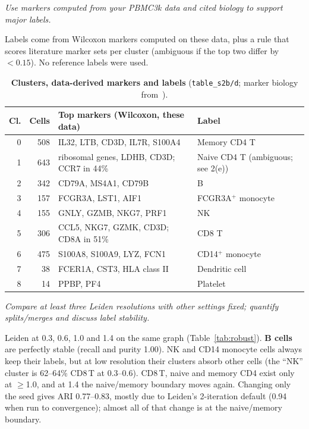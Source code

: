 \documentclass{cisXXX} %
\newcommand{\code}[1]{\texttt{\small #1}}
\newcommand{\q}[1]{\textit{#1}\par\smallskip\noindent}
\begin{document}
\label{s2}
\q{Use markers computed from your PBMC3k data and cited biology to support major labels.}
Labels come from Wilcoxon markers computed on these data, plus a rule that scores literature marker sets per cluster (ambiguous if the top two differ by $<0.15$). No reference labels were used.

\begin{table}[H]
\centering\small
\caption{\textbf{Clusters, data-derived markers and labels} (\code{table\_s2b/d}; marker biology from~\cite{zheng2017,hao2021,villani2017}).}
\label{tab:sc}
\begin{tabularx}{\linewidth}{@{}r r Y l@{}}
\toprule
Cl. & Cells & Top markers (Wilcoxon, these data) & Label \\
 & 508 & IL32, LTB, CD3D, IL7R, S100A4 & Memory CD4 T \\
1 & 643 & ribosomal genes, LDHB, CD3D; CCR7 in 44\% & Naive CD4 T (ambiguous; see 2(e)) \\
2 & 342 & CD79A, MS4A1, CD79B & B \\
3 & 157 & FCGR3A, LST1, AIF1 & FCGR3A$^+$ monocyte \\
4 & 155 & GNLY, GZMB, NKG7, PRF1 & NK \\
5 & 306 & CCL5, NKG7, GZMK, CD3D; CD8A in 51\% & CD8 T \\
6 & 475 & S100A8, S100A9, LYZ, FCN1 & CD14$^+$ monocyte \\
7 & 38 & FCER1A, CST3, HLA class II & Dendritic cell \\
8 & 14 & PPBP, PF4 & Platelet \\
\bottomrule
\end{tabularx}
\end{table}

\label{s3}
\q{Compare at least three Leiden resolutions with other settings fixed; quantify splits/merges and discuss label stability.}
Leiden at 0.3, 0.6, 1.0 and 1.4 on the same graph (Table~\ref{tab:robust}). \textbf{B cells} are perfectly stable (recall and purity 1.00). NK and CD14 monocyte cells always keep their labels, but at low resolution their clusters absorb other cells (the ``NK'' cluster is 62--64\% CD8\,T at 0.3--0.6). CD8\,T, naive and memory CD4 exist only at $\ge$1.0, and at 1.4 the naive/memory boundary moves again. Changing only the seed gives ARI 0.77--0.83, mostly due to Leiden's 2-iteration default (0.94 when run to convergence); almost all of that change is at the naive/memory boundary.
\end{document}
